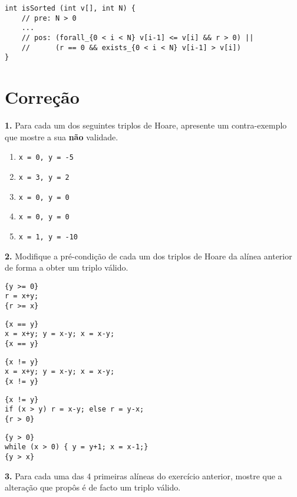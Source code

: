 \documentclass{article}
\begin{document}
\begin{lstlisting}[style=mystyle]
int isSorted (int v[], int N) {
    // pre: N > 0
    ...
    // pos: (forall_{0 < i < N} v[i-1] <= v[i] && r > 0) ||
    //      (r == 0 && exists_{0 < i < N} v[i-1] > v[i])
}
\end{lstlisting}


\section{Correção}
\noindent \textbf{1.} Para cada um dos seguintes triplos de Hoare, apresente um contra-exemplo que mostre a sua \textbf{não} validade.

\begin{enumerate}[label=\alph*)]
    \item \texttt{x = 0, y = -5}
    \item \texttt{x = 3, y = 2}
    \item \texttt{x = 0, y = 0}
    \item \texttt{x = 0, y = 0}
    \item \texttt{x = 1, y = -10}
\end{enumerate}

\noindent \textbf{2.} Modifique a pré-condição de cada um dos triplos de Hoare da alínea anterior de forma a obter um triplo válido.

\begin{lstlisting}[style=mystyle]
{y >= 0}
r = x+y;
{r >= x}
\end{lstlisting}

\begin{lstlisting}[style=mystyle]
{x == y}
x = x+y; y = x-y; x = x-y;
{x == y}
\end{lstlisting}

\begin{lstlisting}[style=mystyle]
{x != y}
x = x+y; y = x-y; x = x-y;
{x != y}
\end{lstlisting}

\begin{lstlisting}[style=mystyle]
{x != y}
if (x > y) r = x-y; else r = y-x;
{r > 0}
\end{lstlisting}

\begin{lstlisting}[style=mystyle]
{y > 0}
while (x > 0) { y = y+1; x = x-1;}
{y > x}
\end{lstlisting}

\noindent \textbf{3.} Para cada uma das 4 primeiras alíneas do exercício anterior, mostre que a alteração que propôs é de facto um triplo válido.
\end{document}
